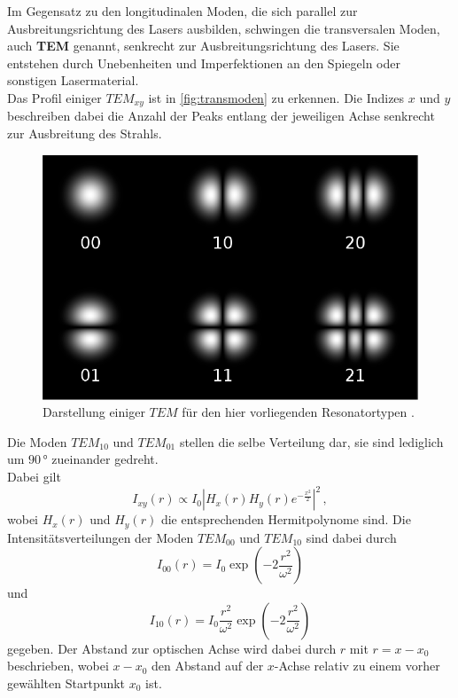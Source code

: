 Im Gegensatz zu den longitudinalen Moden, die sich parallel zur Ausbreitungsrichtung des Lasers ausbilden, schwingen die transversalen Moden, auch \textbf{TEM} genannt, senkrecht zur Ausbreitungsrichtung des Lasers.
Sie entstehen durch Unebenheiten und Imperfektionen an den Spiegeln oder sonstigen Lasermaterial. \\
Das Profil einiger $TEM_{x y}$ ist in \autoref{fig:transmoden} zu erkennen.
Die Indizes $x$ und $y$ beschreiben dabei die Anzahl der Peaks entlang der jeweiligen Achse senkrecht zur Ausbreitung des Strahls.

\begin{figure}[H]
    \centering
    \includegraphics[width=.5\textwidth]{figures/TransversaleModen.pdf}
    \caption{Darstellung einiger $TEM$ für den hier vorliegenden Resonatortypen \cite{transmode}.}
    \label{fig:transmoden}
\end{figure}

Die Moden $TEM_{10}$ und $TEM_{01}$ stellen die selbe Verteilung dar, sie sind lediglich um $90 \,°$ zueinander gedreht. \\
Dabei gilt
\begin{equation*}
    I_{xy} (r) \propto I_0 \left| H_x(r) H_y(r) e^{-\frac{x^2}{2}} \right|^2  \, ,
\end{equation*}
wobei $H_x(r)$ und $H_y(r)$ die entsprechenden Hermitpolynome sind.
Die Intensitätsverteilungen der Moden $TEM_{00}$ und $TEM_{10}$ sind dabei durch
\begin{equation}
    I_{00} (r) = I_0 \exp \left(-2\frac{r^2}{\omega^2} \right)
    \label{eq:int00}
\end{equation}
und
\begin{equation}
    I_{10} (r) = I_0 \frac{r^2}{\omega^2} \exp \left(-2\frac{r^2}{\omega^2}\right)
    \label{eq:int10}
\end{equation}
gegeben.
Der Abstand zur optischen Achse wird dabei durch $r$ mit $r = x - x_0$ beschrieben, wobei $x - x_0$ den Abstand auf der $x$-Achse relativ zu einem vorher gewählten Startpunkt $x_0$ ist. \\

